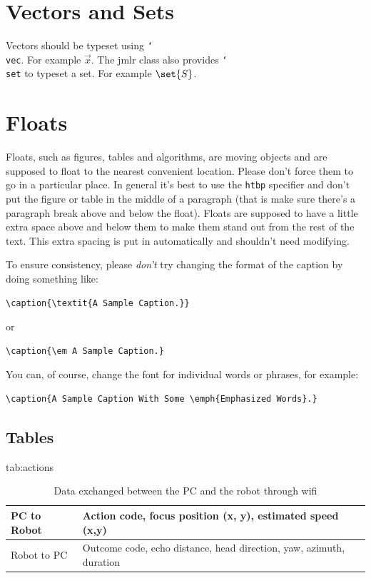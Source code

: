 \documentclass[pmlr]{jmlr}%
\newcommand{\cs}[1]{\texttt{\char`\\#1}}
\begin{document}
\section{Vectors and Sets}
\label{sec:vec}

Vectors should be typeset using \cs{vec}. For example $\vec{x}$.
The \textsf{jmlr} class also provides \cs{set} to typeset a
set. For example $\set{S}$.

\section{Floats}
\label{sec:floats}

Floats, such as figures, tables and algorithms, are moving
objects and are supposed to float to the nearest convenient
location. Please don't force them to go in a particular place. In
general it's best to use the \texttt{htbp} specifier and don't
put the figure or table in the middle of a paragraph (that is
make sure there's a paragraph break above and below the float).
Floats are supposed to have a little extra space above and below
them to make them stand out from the rest of the text. This extra
spacing is put in automatically and shouldn't need modifying.

To ensure consistency, please \emph{don't} try changing the format of the caption by doing
something like:
\begin{verbatim}
\caption{\textit{A Sample Caption.}}
\end{verbatim}
or
\begin{verbatim}
\caption{\em A Sample Caption.}
\end{verbatim}
You can, of course, change the font for individual words or 
phrases, for example:
\begin{verbatim}
\caption{A Sample Caption With Some \emph{Emphasized Words}.}
\end{verbatim}

\subsection{Tables}
\label{sec:tables}


\begin{table}[htbp]
\floatconts
  {tab:actions}%
  {\caption{Data exchanged between the PC and the robot through wifi}}%
  {\begin{tabular}{l|l}
  \toprule
  PC to Robot & Action code, focus position (x, y), estimated speed (x,y)\\
  \midrule
  Robot to PC & Outcome code, echo distance, head direction, yaw, azimuth, duration\\
  \bottomrule
  \end{tabular}}
\end{table}
\end{document}
